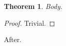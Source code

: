 \documentclass{article}
\newtheorem{thm}{Theorem}
\begin{document}
\begin{thm}Body.\end{thm}
\begin{proof}Trivial.\end{proof}
After.
\end{document}
